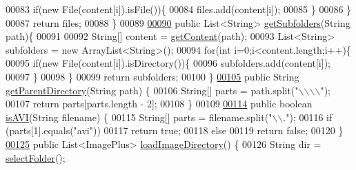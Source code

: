 \begin{DoxyCode}
00083       \textcolor{keywordflow}{if}(\textcolor{keyword}{new} File(content[i]).isFile())\{
00084         files.add(content[i]);
00085       \}
00086     \}
00087     \textcolor{keywordflow}{return} files;    
00088   \}
00089   
\hypertarget{_file_manager_8java_source_l00090}{}\hyperlink{classfunctions_1_1_file_manager_a73efd872c86ccdce535ddb2798aaaea4}{00090}   \textcolor{keyword}{public} List<String> \hyperlink{classfunctions_1_1_file_manager_a73efd872c86ccdce535ddb2798aaaea4}{getSubfolders}(String path)\{
00091     
00092     String[] content = \hyperlink{classfunctions_1_1_file_manager_a8d912a4b181b284e6c05e0f44f541e48}{getContent}(path);
00093     List<String> subfolders = \textcolor{keyword}{new} ArrayList<String>();
00094     \textcolor{keywordflow}{for}(\textcolor{keywordtype}{int} i=0;i<content.length;i++)\{
00095       \textcolor{keywordflow}{if}(\textcolor{keyword}{new} File(content[i]).isDirectory())\{
00096         subfolders.add(content[i]);
00097       \}
00098     \}
00099     \textcolor{keywordflow}{return} subfolders;
00100   \}
\hypertarget{_file_manager_8java_source_l00105}{}\hyperlink{classfunctions_1_1_file_manager_aa9e15d838c5a7a0e3906d9ceec253398}{00105}   \textcolor{keyword}{public} String \hyperlink{classfunctions_1_1_file_manager_aa9e15d838c5a7a0e3906d9ceec253398}{getParentDirectory}(String path) \{
00106     String[] parts = path.split(\textcolor{stringliteral}{"\(\backslash\)\(\backslash\)\(\backslash\)\(\backslash\)"});
00107     \textcolor{keywordflow}{return} parts[parts.length - 2];
00108   \}
00109   
\hypertarget{_file_manager_8java_source_l00114}{}\hyperlink{classfunctions_1_1_file_manager_aef15c5bfadc70a7333a3103e85e7bf65}{00114}   \textcolor{keyword}{public} \textcolor{keywordtype}{boolean} \hyperlink{classfunctions_1_1_file_manager_aef15c5bfadc70a7333a3103e85e7bf65}{isAVI}(String filename) \{
00115     String[] parts = filename.split(\textcolor{stringliteral}{"\(\backslash\)\(\backslash\)."});
00116     \textcolor{keywordflow}{if} (parts[1].equals(\textcolor{stringliteral}{"avi"}))
00117       \textcolor{keywordflow}{return} \textcolor{keyword}{true};
00118     \textcolor{keywordflow}{else}
00119       \textcolor{keywordflow}{return} \textcolor{keyword}{false};
00120   \}
\hypertarget{_file_manager_8java_source_l00125}{}\hyperlink{classfunctions_1_1_file_manager_a0f8b52da290ba020437d01d4873b1d2c}{00125}   \textcolor{keyword}{public} List<ImagePlus> \hyperlink{classfunctions_1_1_file_manager_a0f8b52da290ba020437d01d4873b1d2c}{loadImageDirectory}() \{
00126     String dir = \hyperlink{classfunctions_1_1_file_manager_af19fd6734ccb746c4f276c83b6a47689}{selectFolder}();

\end{DoxyCode}
